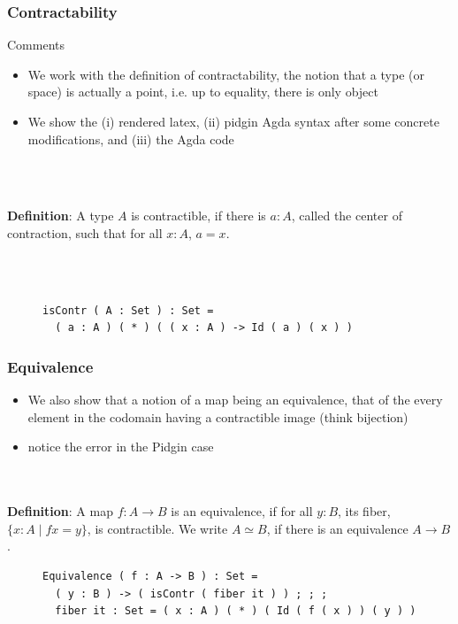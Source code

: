 \documentclass[9pt]{beamer}
\newcommand{\equalH}[2]{#1 = #2}
\newcommand{\comprehensionH}[3]{\{ #1 : #2 \mid #3 \}}
\newcommand{\arrowH}[2]{#1 \rightarrow #2}
\newcommand{\appH}[2]{#1 #2}
\newcommand{\equivalenceH}[2]{#1 \simeq #2}
\newcommand{\equalH}[2]{#1 = #2}
\newcommand{\comprehensionH}[3]{\{ #1 : #2 \mid #3 \}}
\newcommand{\arrowH}[2]{#1 \rightarrow #2}
\newcommand{\appH}[2]{#1 #2}
\newcommand{\equivalenceH}[2]{#1 \simeq #2}
\begin{document}
\begin{frame}[fragile]
\frametitle{Contractability}

\begin{block}{Comments}
\begin{itemize}
\item We work with the definition of contractability, the notion that a type (or space) is
actually a point, i.e. up to equality, there is only object
\item We show the (i) rendered latex, (ii)  pidgin Agda syntax after some concrete
  modifications, and (iii) the Agda code
\end{itemize}\\~\\
\end{block}

\textbf{Definition}:
A type $A$ is contractible, if there is $a : A$, called the center of contraction, such that for all $x : A$, $\equalH {a}{x}$.

\\~\\
\begin{figure}
\begin{verbatim}
isContr ( A : Set ) : Set = 
  ( a : A ) ( * ) ( ( x : A ) -> Id ( a ) ( x ) )
\end{verbatim}
\end{figure}



\end{frame}

\begin{frame}[fragile]
\frametitle{Equivalence}
\begin{itemize}
\item We also show that a notion of a map being an equivalence, that of the
  every element in the codomain having a contractible image (think bijection) 
\item notice the error in the Pidgin case
\end{itemize}

\\~\\

 \textbf{Definition}:
 A map $f : \arrowH {A}{B}$ is an equivalence, if for all $y : B$, its fiber, $\comprehensionH {x}{A}{\equalH {\appH {f}{x}}{y}}$, is contractible.
 We write $\equivalenceH {A}{B}$, if there is an equivalence $\arrowH {A}{B}$.


\begin{figure}
\begin{verbatim}
Equivalence ( f : A -> B ) : Set = 
  ( y : B ) -> ( isContr ( fiber it ) ) ; ; ; 
  fiber it : Set = ( x : A ) ( * ) ( Id ( f ( x ) ) ( y ) )
\end{verbatim}
\end{figure}


\end{frame}
\end{document}
